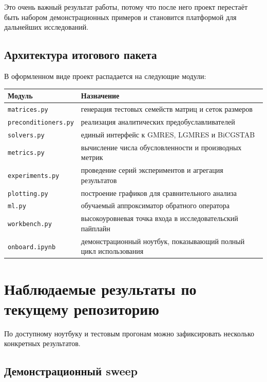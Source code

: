 \documentclass[12pt,a4paper]{article}
\begin{document}
Это очень важный результат работы, потому что после него проект перестаёт быть набором демонстрационных примеров и становится платформой для дальнейших исследований.

\subsection{Архитектура итогового пакета}

В оформленном виде проект распадается на следующие модули:

\begin{center}
\begin{tabular}{>{\raggedright\arraybackslash}p{4cm} >{\raggedright\arraybackslash}p{9cm}}
\toprule
\textbf{Модуль} & \textbf{Назначение} \\
\midrule
\texttt{matrices.py} & генерация тестовых семейств матриц и сеток размеров \\
\texttt{preconditioners.py} & реализация аналитических предобуславливателей \\
\texttt{solvers.py} & единый интерфейс к GMRES, LGMRES и BiCGSTAB \\
\texttt{metrics.py} & вычисление числа обусловленности и производных метрик \\
\texttt{experiments.py} & проведение серий экспериментов и агрегация результатов \\
\texttt{plotting.py} & построение графиков для сравнительного анализа \\
\texttt{ml.py} & обучаемый аппроксиматор обратного оператора \\
\texttt{workbench.py} & высокоуровневая точка входа в исследовательский пайплайн \\
\texttt{onboard.ipynb} & демонстрационный ноутбук, показывающий полный цикл использования \\
\bottomrule
\end{tabular}
\end{center}

\section{Наблюдаемые результаты по текущему репозиторию}

По доступному ноутбуку и тестовым прогонам можно зафиксировать несколько конкретных результатов.

\subsection{Демонстрационный sweep}
\end{document}
